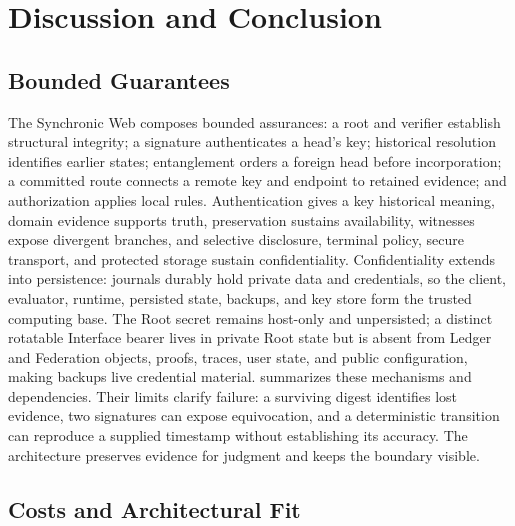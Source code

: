\section{Discussion and Conclusion}
\label{sec:assessment}
\label{sec:properties}
\label{sec:tradeoffs}
\label{sec:conclusion}

\subsection{Bounded Guarantees}

The Synchronic Web composes bounded assurances: a root and verifier establish structural integrity; a signature authenticates a head's key; historical resolution identifies earlier states; entanglement orders a foreign head before incorporation; a committed route connects a remote key and endpoint to retained evidence; and authorization applies local rules. Authentication gives a key historical meaning, domain evidence supports truth, preservation sustains availability, witnesses expose divergent branches, and selective disclosure, terminal policy, secure transport, and protected storage sustain confidentiality. Confidentiality extends into persistence: journals durably hold private data and credentials, so the client, evaluator, runtime, persisted state, backups, and key store form the trusted computing base. The Root secret remains host-only and unpersisted; a distinct rotatable Interface bearer lives in private Root state but is absent from Ledger and Federation objects, proofs, traces, user state, and public configuration, making backups live credential material.  summarizes these mechanisms and dependencies. Their limits clarify failure: a surviving digest identifies lost evidence, two signatures can expose equivocation, and a deterministic transition can reproduce a supplied timestamp without establishing its accuracy. The architecture preserves evidence for judgment and keeps the boundary visible.

\begin{table}[htbp]
  \centering
  \small
  
  \caption{Architectural Assurance Boundaries}
  \label{tab:assurance-matrix}
\end{table}

\subsection{Costs and Architectural Fit}

